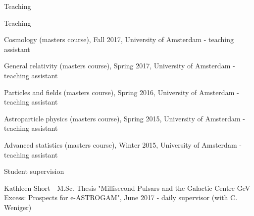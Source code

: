 \begin{rSection}{Teaching}
\begin{rSubsection}{Teaching}{}{}{}
\vspace{-1.5em}
	\item Cosmology (masters course), Fall 2017, University of Amsterdam - teaching assistant
	\item General relativity (masters course), Spring 2017, University of Amsterdam - teaching assistant
	\item Particles and fields (masters course), Spring 2016, University of Amsterdam - teaching assistant
	\item Astroparticle physics (masters course), Spring 2015, University of Amsterdam - teaching assistant
	\item Advanced statistics (masters course), Winter 2015, University of Amsterdam - teaching assistant
\end{rSubsection}

\begin{rSubsection}{Student supervision}{}{}{}
\vspace{-1.5em}
	\item Kathleen Short - M.Sc. Thesis "Millisecond Pulsars and the Galactic Centre GeV Excess: Prospects for e-ASTROGAM", June 2017 - daily supervisor (with C. Weniger) 
\end{rSubsection}
\end{rSection}

